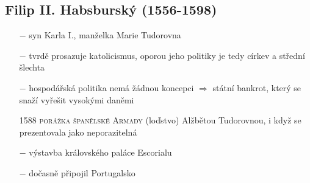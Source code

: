 \documentclass{article}
\begin{document}
\subsection*{Filip II. Habsburský (1556-1598)}
\begin{itemize}
    \vspace{-0.5em}
    \setlength\itemsep{0.15em}
    \item[$-$] syn Karla I., manželka Marie Tudorovna
    \item[$-$] tvrdě prosazuje katolicismus, oporou jeho politiky je tedy církev a střední šlechta
    \item[$-$] hospodářská politika nemá žádnou koncepci $\Rightarrow$ státní bankrot, který se snaží vyřešit vysokými daněmi
    \item[1588] \textsc{porážka španělské Armady} (loďstvo) Alžbětou Tudorovnou, i když se prezentovala jako neporazitelná
    \item[$-$] výstavba královského paláce Escorialu
    \item[$-$] dočasně připojil Portugalsko
\end{itemize}
\end{document}
